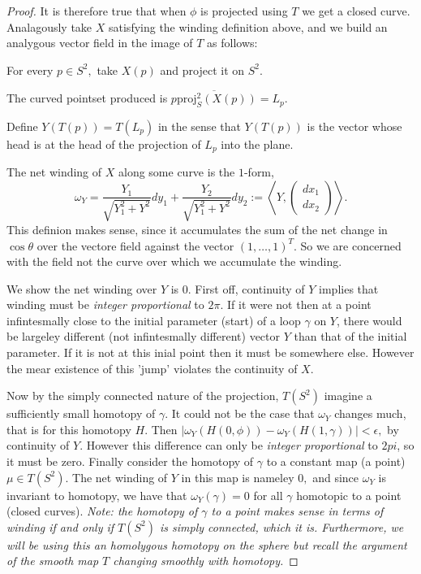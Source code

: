 \documentclass[letter]{article}
\newenvironment{menumerate}{%
  \edef\backupindent{\the\parindent}%
  \enumerate%
  \setlength{\parindent}{\backupindent}%
}{\endenumerate}
\begin{document}
\begin{menumerate}
\begin{menumerate}
\begin{proof}
			It is therefore true that when $\phi$ is projected using $T$ we get a closed curve. Analagously take $X$ satisfying the winding
			definition above, and we build an analygous vector field in the image of $T$ as follows: 
			\begin{menumerate}
			 	\item For every $p \in S^2,$ take $X(p)$ and project it on $S^2$.
			 	\item The curved pointset produced is $\overline{p \mathrm{proj}_S^2(X(p))} = L_p.$
			 	\item Define $Y(T(p)) = T(L_p)$ in the sense that $Y(T(p))$ is the vector whose head is at the head
			 	of the projection of $L_p$ into the plane. 
			 \end{menumerate} 

			 The net winding of $X$ along some curve is the $1$-form, 
			 \begin{equation}
			 	\omega_Y = \frac{Y_1}{\sqrt{Y_1^2 + Y^2}}dy_1 + \frac{Y_2}{\sqrt{Y_1^2 + Y^2}} dy_2 := \left\langle Y, \begin{pmatrix}
			 		dx_1 \\
			 		dx_2
			 	\end{pmatrix} \right\rangle.
			 \end{equation}
			 This definion makes sense, since it accumulates the sum of the net change in $\cos\theta$ over the vectore field 
			 against the vector $(1,\dots,1)^T.$ So we are concerned with the field not the curve over which we accumulate the winding.

			 We show the net winding over $Y$ is $0$. First off, continuity of $Y$ implies that winding must be \emph{integer proportional} to $2\pi$.
			 If it were not then at a point infintesmally close to the initial parameter (start) of a loop $\gamma$ on $Y$, there would be 
			 largeley different (not infintesmally different) vector $Y$ than that of the initial parameter. If it is not at this inial point
			 then it must be somewhere else. However the mear existence of this 'jump' violates the continuity of $X.$ 

			 Now by the simply connected
			 nature of the projection, $T(S^2)$ imagine a sufficiently small homotopy of $\gamma$. It could not be the case that $\omega_Y$ changes
			 much, that is for this homotopy $H.$ Then $|\omega_Y(H(0,\phi)) - \omega_Y(H(1,\gamma))| < \epsilon,$ by continuity of $Y.$  However
			 this difference can only be \emph{integer proportional} to $2pi$, so it must be zero. Finally consider the homotopy of $\gamma$ to
			 a constant map (a point) $\mu \in T(S^2).$ The net winding of $Y$ in this map is nameley $0,$ and since $\omega_Y$ is invariant
			 to homotopy, we have that $\omega_Y(\gamma) = 0 $ for all $ \gamma$ homotopic to a point (closed curves). \emph{Note: the homotopy
			 of $\gamma$ to a point makes sense in terms of winding if and only if $T(S^2)$ is simply connected, which it is. Furthermore, 
			 we will be using this an homolygous homotopy on the sphere but recall the argument of the smooth map $T$ changing smoothly with homotopy.}


\end{proof}
\end{menumerate}
\end{menumerate}
\end{document}
